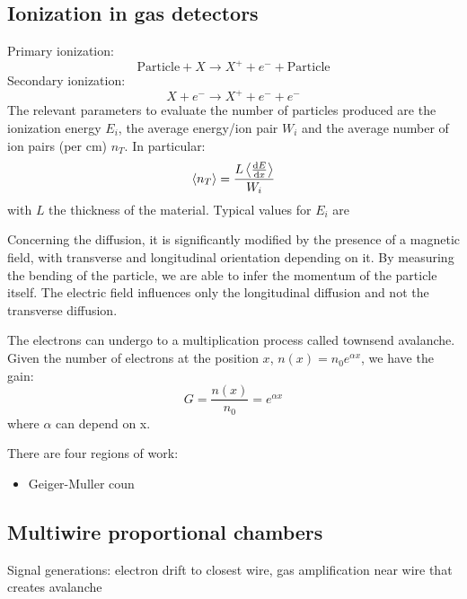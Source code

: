 \documentclass[../../main/main.tex]{subfiles}
\begin{document}
\subsection{Ionization in gas detectors}
Primary ionization:
\begin{equation}
    \text{Particle} + X \longrightarrow X^+ + e^- + \text{Particle}
    \label{eq:}
\end{equation}
Secondary ionization:
\begin{equation}
    X + e^- \longrightarrow X^+ + e^- + e^-
    \label{eq:}
\end{equation}
The relevant parameters to evaluate the number of particles produced are the ionization energy \( E_i \), the average energy/ion pair \( W_i \) and the average number of ion pairs (per cm) \( n_T \).  In particular:
\begin{equation}
    \left\langle n_T \right\rangle
    =
    \frac{L \left\langle \dv{E}{x} \right\rangle}{W_i}
    \label{eq:}
\end{equation}
with \( L \) the thickness of the material. Typical values for \( E_i \) are

Concerning the diffusion, it is significantly modified by the presence of a magnetic field, with transverse and longitudinal orientation depending on it. By measuring the bending of the particle, we are able to infer the momentum of the particle itself. The electric field influences only the longitudinal diffusion and not the transverse diffusion.

The electrons can undergo to a multiplication process called townsend avalanche. Given the number of electrons at the position \( x \), \( n(x) = n_0 e^{\alpha x} \), we have the gain:
\begin{equation}
    G
    =
    \frac{n(x)}{n_0}
    =
    e^{\alpha x}
    \label{eq:}
\end{equation}
where \( \alpha \) can depend on x.

There are four regions of work:
\begin{itemize}
    \item Geiger-Muller coun
\end{itemize}



\subsection{Multiwire proportional chambers}
Signal generations: electron drift to closest wire, gas amplification near wire that creates avalanche
\end{document}
